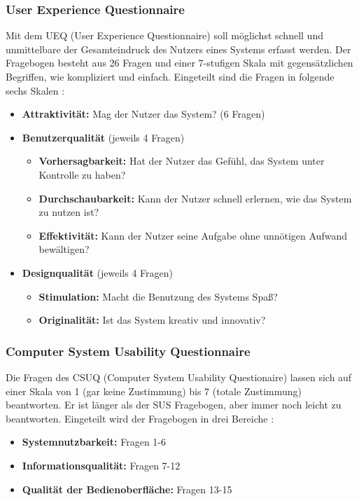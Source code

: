 \subsubsection*{User Experience Questionnaire}
Mit dem UEQ (User Experience Questionnaire) soll möglichst schnell und unmittelbare der Gesamteindruck des Nutzers eines Systems erfasst werden. Der Fragebogen besteht aus 26 Fragen und einer 7-stufigen Skala mit gegensätzlichen Begriffen, wie kompliziert und einfach. Eingeteilt sind die Fragen in folgende sechs Skalen \cite{Schrepp2015}:
\begin{itemize}
\item \textbf{Attraktivität:} Mag der Nutzer das System? (6 Fragen)
\item \textbf{Benutzerqualität} (jeweils 4 Fragen)
	\begin{itemize}
	\item \textbf{Vorhersagbarkeit:} Hat der Nutzer das Gefühl, das System unter Kontrolle zu haben?
	\item \textbf{Durchschaubarkeit:} Kann der Nutzer schnell erlernen, wie das System zu nutzen ist?
	\item \textbf{Effektivität:} Kann der Nutzer seine Aufgabe ohne unnötigen Aufwand bewältigen?
	\end{itemize}
\item \textbf{Designqualität} (jeweils 4 Fragen)
	\begin{itemize}
	\item \textbf{Stimulation:} Macht die Benutzung des Systems Spaß?
	\item \textbf{Originalität:} Ist das System kreativ und innovativ?
	\end{itemize}
\end{itemize}

\subsubsection*{Computer System Usability Questionnaire}
Die Fragen des CSUQ (Computer System Usability Questionaire) lassen sich auf einer Skala von 1 (gar keine Zustimmung) bis 7 (totale Zustimmung) beantworten. Er ist länger als der SUS Fragebogen, aber immer noch leicht zu beantworten. Eingeteilt wird der Fragebogen in drei Bereiche \cite{Lewis2018}:
\begin{itemize}
\item \textbf{Systemnutzbarkeit:} Fragen 1-6
\item \textbf{Informationsqualität:} Fragen 7-12
\item \textbf{Qualität der Bedienoberfläche:} Fragen 13-15
\end{itemize}

